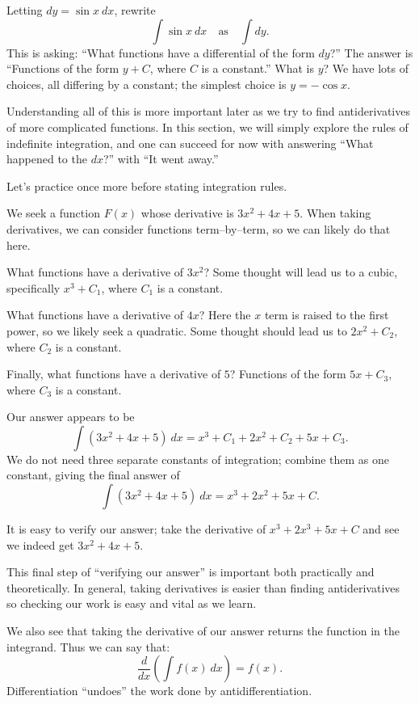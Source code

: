 Letting $dy = \sin x\ dx$,  rewrite 
$$\int \sin x \ dx \quad \text{as}\quad \int  dy.$$
This is asking: ``What functions have a differential of the form $dy$?'' The answer is ``Functions of the form $y+C$, where $C$ is a constant.'' What is $y$? We have lots of choices, all differing by a constant; the simplest choice is $y = -\cos x$.

Understanding all of this is more important later as we try to find antiderivatives of more complicated functions. In this section, we will simply explore the rules of indefinite integration, and one can succeed for now with answering ``What happened to the $dx$?'' with ``It went away.''

Let's practice once more before stating integration rules.

{We seek a function $F(x)$ whose derivative is $3x^2+4x+5$. When taking derivatives, we can consider functions term--by--term, so we can likely do that here.

What functions have a derivative of $3x^2$? Some thought will lead us to a cubic, specifically $x^3+C_1$, where $C_1$ is a constant. 

What functions have a derivative of $4x$? Here the $x$ term is raised to the first power, so we likely seek a quadratic. Some thought should lead us to $2x^2+C_2$, where $C_2$ is a constant.

Finally, what functions have a derivative of $5$? Functions of the form $5x+C_3$, where $C_3$ is a constant.

Our answer appears to be 
$$\int (3x^2+4x+5)\ dx = x^3+C_1+2x^2+C_2+5x+C_3.$$ We do not need three separate constants of integration; combine them as one constant, giving the final answer of 
$$\int (3x^2+4x+5)\ dx = x^3+2x^2+5x+C.$$

It is easy to verify our answer; take the derivative of $x^3+2x^3+5x+C$ and see we indeed get $3x^2+4x+5$.}

This final step of ``verifying our answer'' is important both practically and theoretically. In general, taking derivatives is easier than finding antiderivatives so checking our work is easy and vital as we learn.

We also see that taking the derivative of our answer returns the function in the integrand. Thus we can say that: $$\frac{d}{dx}\left(\int f(x)\ dx\right) = f(x).$$
Differentiation ``undoes'' the work done by antidifferentiation. 

